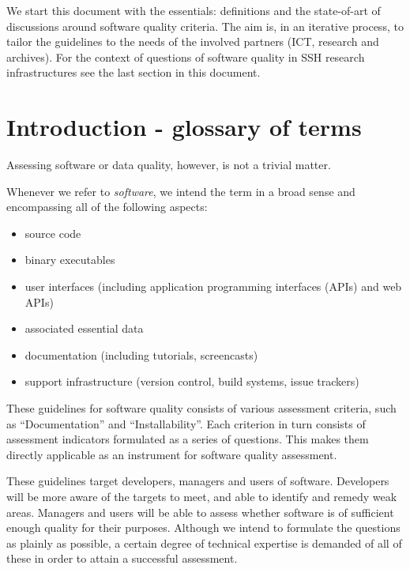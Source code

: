 \documentclass[a4paper,11pt]{article}
\begin{document}
We start this document with the essentials: definitions and the state-of-art
of discussions around software quality criteria. The aim is, in an iterative
process, to tailor the guidelines to the needs of the involved partners (ICT,
research and archives). For the context of questions of software quality in SSH
research infrastructures see the last section in this document.

\section{Introduction - glossary of terms}

Assessing software or data quality, however, is not a trivial matter. 

Whenever we refer to \emph{software}, we intend the term in a broad sense and
encompassing all of the following aspects:
\begin{itemize}
    \item source code
    \item binary executables
    \item user interfaces (including application programming interfaces (APIs) and web APIs)
    \item associated essential data
%
%
%
    \item documentation (including tutorials, screencasts)
    \item support infrastructure (version control, build systems, issue trackers)
\end{itemize}

These guidelines for software quality consists of various assessment
criteria, such as ``Documentation'' and ``Installability''. Each criterion in turn
consists of assessment indicators formulated as a series of questions. This
makes them directly applicable as an instrument for software quality
assessment. 

These guidelines target developers, managers and users of software.
Developers will be more aware of the targets to meet, and able to identify and
remedy weak areas. Managers and users will be able to assess whether software
is of sufficient enough quality for their purposes. Although we intend to
formulate the questions as plainly as possible, a certain degree of technical
expertise is demanded of all of these in order to attain a successful
assessment.
\end{document}
